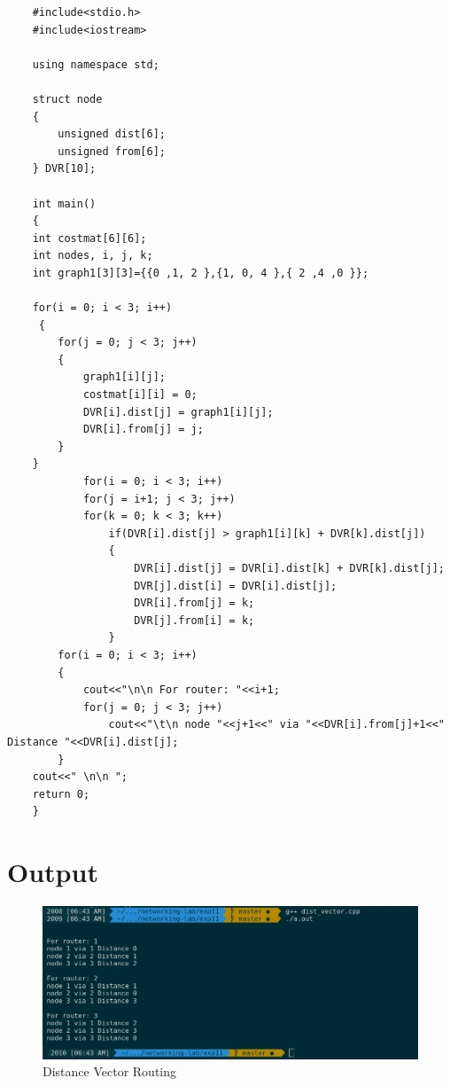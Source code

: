 \documentclass[a4paper,12pt]{article}
\begin{document}
\begin{verbatim}
    #include<stdio.h>
    #include<iostream>
    
    using namespace std;                                            
    
    struct node
    {
        unsigned dist[6];
        unsigned from[6];
    } DVR[10];
    
    int main()
    {
    int costmat[6][6];
    int nodes, i, j, k;
    int graph1[3][3]={{0 ,1, 2 },{1, 0, 4 },{ 2 ,4 ,0 }};
    
    for(i = 0; i < 3; i++)
     {
        for(j = 0; j < 3; j++)
        {
            graph1[i][j];
            costmat[i][i] = 0;
            DVR[i].dist[j] = graph1[i][j]; 
            DVR[i].from[j] = j;
        }
    }
            for(i = 0; i < 3; i++) 
            for(j = i+1; j < 3; j++)
            for(k = 0; k < 3; k++)
                if(DVR[i].dist[j] > graph1[i][k] + DVR[k].dist[j])
                {   
                    DVR[i].dist[j] = DVR[i].dist[k] + DVR[k].dist[j];
                    DVR[j].dist[i] = DVR[i].dist[j];
                    DVR[i].from[j] = k;
                    DVR[j].from[i] = k;
                }
        for(i = 0; i < 3; i++)
        {
            cout<<"\n\n For router: "<<i+1;
            for(j = 0; j < 3; j++)
                cout<<"\t\n node "<<j+1<<" via "<<DVR[i].from[j]+1<<" Distance "<<DVR[i].dist[j];
        }
    cout<<" \n\n ";
    return 0;
    }
\end{verbatim}

\section{Output}
\begin{figure}
    \includegraphics[width=\linewidth]{dist-vector.png}
    \caption{Distance Vector Routing}
    \end{figure}
\end{document}
